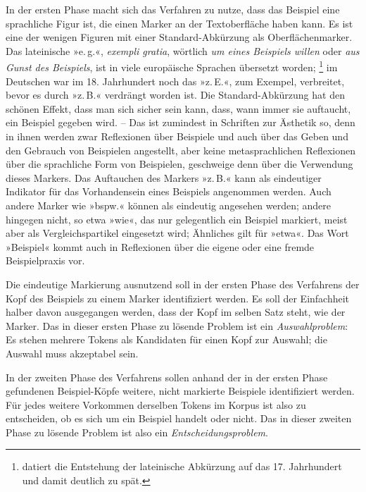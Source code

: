 \documentclass{article}
\newcommand*{\latein}{\textit}%
\renewcommand*{\see}{\autocap{v}gl\adddot}%
\begin{document}
In der ersten Phase macht sich das Verfahren zu nutze, dass das
Beispiel eine sprachliche Figur ist, die einen Marker an der
Textoberfläche haben kann. Es ist eine der wenigen Figuren mit einer
Standard-Abkürzung als Oberflächenmarker. Das lateinische »e.\,g.«,
\latein{exempli gratia}, wörtlich \emph{um eines Beispiels willen}
oder \emph{aus Gunst des Beispiels}, ist in viele europäische Sprachen
übersetzt worden;%
\footnote{\Textcite[118]{Cappelli1990a} datiert die Entstehung der
  lateinische Abkürzung auf das 17. Jahrhundert und damit deutlich zu
  spät.} %
im Deutschen war im 18. Jahrhundert noch das »z.\,E.«, zum Exempel,
verbreitet, bevor es durch »z.\,B.« verdrängt worden ist. %
Die Standard-Abkürzung hat den schönen Effekt, dass man sich sicher
sein kann, dass, wann immer sie auftaucht, ein Beispiel gegeben
wird. -- Das ist zumindest in Schriften zur Ästhetik so, denn in ihnen
werden zwar Reflexionen über Beispiele und auch über das Geben und den
Gebrauch von Beispielen angestellt, aber keine metasprachlichen
Reflexionen über die sprachliche Form von Beispielen, geschweige denn
über die Verwendung dieses Markers. Das Auftauchen des Markers
»z.\,B.« kann als eindeutiger Indikator für das Vorhandensein eines
Beispiels angenommen werden. Auch andere Marker wie »bspw.« können als
eindeutig angesehen werden; andere hingegen nicht, so etwa »wie«, das
nur gelegentlich ein Beispiel markiert, meist aber als
Vergleichspartikel eingesetzt wird; Ähnliches gilt für »etwa«. Das
Wort »Beispiel« kommt auch in Reflexionen über die eigene oder eine
fremde Beispielpraxis vor.

Die eindeutige Markierung ausnutzend soll in der ersten Phase des
Verfahrens der Kopf des Beispiels zu einem Marker identifiziert
werden. Es soll der Einfachheit halber davon ausgegangen werden, dass
der Kopf im selben Satz steht, wie der Marker. Das in dieser ersten
Phase zu lösende Problem ist ein \emph{Auswahlproblem}: Es stehen
mehrere Tokens als Kandidaten für einen Kopf zur Auswahl; die Auswahl
muss akzeptabel sein.

In der zweiten Phase des Verfahrens sollen anhand der in der ersten
Phase gefundenen Beispiel-Köpfe weitere, nicht markierte Beispiele
identifiziert werden. Für jedes weitere Vorkommen derselben Tokens im
Korpus ist also zu entscheiden, ob es sich um ein Beispiel handelt
oder nicht. Das in dieser zweiten Phase zu lösende Problem ist also
ein \emph{Entscheidungsproblem}.
\end{document}
